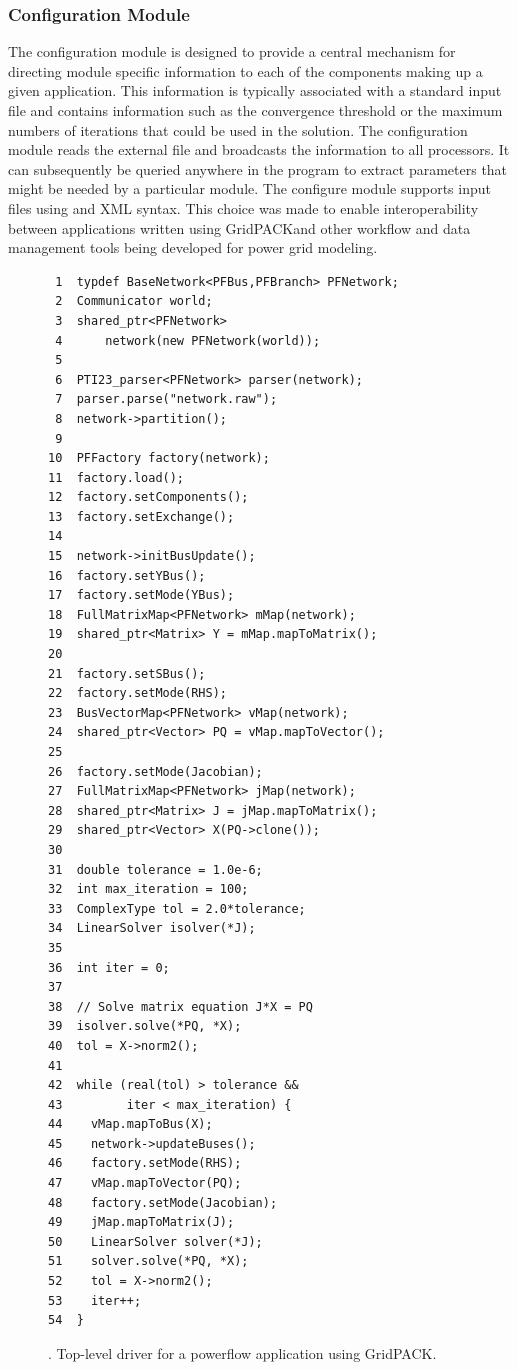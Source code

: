 \documentclass[preprint]{acm_proc_article-sp}
\begin{document}
\subsubsection{Configuration Module}
The configuration module is designed to provide a central mechanism for directing module
specific information to each of the components making up a given application.
This information is typically associated with a standard input file and contains
information such as the convergence threshold or the maximum numbers of
iterations that could be used in the solution. The configuration module reads the
external file and broadcasts the information to all processors. It can
subsequently be queried anywhere in the program to extract parameters that might
be needed by a particular module. The configure module supports input files
using and XML syntax. This choice was made to enable interoperability between
applications written using GridPACK\texttrademark and other workflow and data
management tools being developed for power grid modeling.
\begin{figure}
\begin{verbatim}
 1  typdef BaseNetwork<PFBus,PFBranch> PFNetwork;
 2  Communicator world;
 3  shared_ptr<PFNetwork>
 4      network(new PFNetwork(world));
 5
 6  PTI23_parser<PFNetwork> parser(network);
 7  parser.parse("network.raw");
 8  network->partition();
 9
10  PFFactory factory(network);
11  factory.load();
12  factory.setComponents();
13  factory.setExchange();
14
15  network->initBusUpdate();
16  factory.setYBus();
17  factory.setMode(YBus); 
18  FullMatrixMap<PFNetwork> mMap(network);
19  shared_ptr<Matrix> Y = mMap.mapToMatrix();
20
21  factory.setSBus();
22  factory.setMode(RHS); 
23  BusVectorMap<PFNetwork> vMap(network);
24  shared_ptr<Vector> PQ = vMap.mapToVector();
25
26  factory.setMode(Jacobian);
27  FullMatrixMap<PFNetwork> jMap(network);
28  shared_ptr<Matrix> J = jMap.mapToMatrix();
29  shared_ptr<Vector> X(PQ->clone());
30
31  double tolerance = 1.0e-6;
32  int max_iteration = 100;
33  ComplexType tol = 2.0*tolerance;
34  LinearSolver isolver(*J);
35
36  int iter = 0;
37
38  // Solve matrix equation J*X = PQ
39  isolver.solve(*PQ, *X);
40  tol = X->norm2();
41
42  while (real(tol) > tolerance &&
43         iter < max_iteration) {
44    vMap.mapToBus(X);
45    network->updateBuses();
46    factory.setMode(RHS);
47    vMap.mapToVector(PQ);
48    factory.setMode(Jacobian);
49    jMap.mapToMatrix(J);
50    LinearSolver solver(*J);
51    solver.solve(*PQ, *X);
52    tol = X->norm2();
53    iter++;
54  }
\end{verbatim}
\caption{\label{pf_app}. Top-level driver for a powerflow application using
GridPACK\texttrademark.}
\end{figure}
\end{document}
